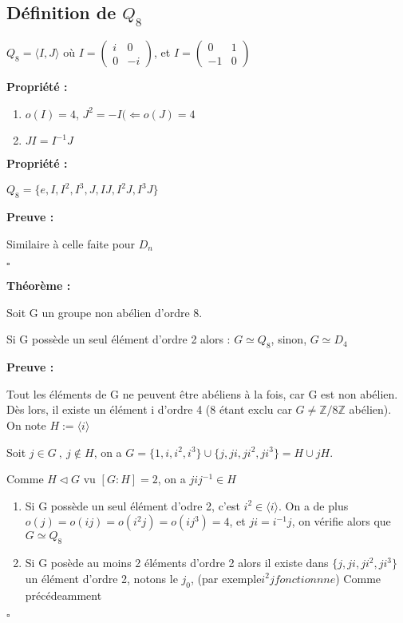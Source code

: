\documentclass{report}
\renewenvironment{leftbar}{%
  \def\FrameCommand{\vrule width 0.4pt \hspace{10pt}}%
  \MakeFramed {\advance\hsize-\width \FrameRestore}}%
 {\endMakeFramed}%
\newenvironment{preuve}{\vspace*{0.5cm}
    \begin{leftbar}
    \noindent\textbf{Preuve :}\par}{
    \begin{flushright}
    $\square$
    \end{flushright}
    \end{leftbar}
}
\newenvironment{prop}{\begin{tcolorbox}[colframe= white]
    \textbf{Propriété :}
     \par}
    {\end{tcolorbox}}
\newenvironment{theoreme}[1][]{
    \begin{tcolorbox}[]
    \textbf{Théorème :} #1  \par} 
    {\end{tcolorbox}}
\newcommand{\Z}{\mathbb{Z}}
\newcommand{\dn}{D_{n}}
\begin{document}
\subsection{Définition de $Q_{8}$}

$Q_{8}= \langle I,J \rangle$ où $I = \begin{pmatrix}
i&0\\
0&-i
\end{pmatrix}$, et $I = \begin{pmatrix}
0&1\\
-1&0
\end{pmatrix}$

\begin{prop}
\begin{enumerate}
\item $o(I)=4$, $J^2=-I(\Leftarrow o(J)=4$
\item $JI=I^{-1}J$
\end{enumerate}
\end{prop}


\begin{prop}
$Q_{8}= \{ e,I,I^{2},I^{3},J,IJ,I^{2}J,I^{3}J \}$
\end{prop}
\begin{preuve}
Similaire à celle faite pour $\dn$
\end{preuve}


\begin{theoreme}
Soit G un groupe non abélien d'ordre 8.\par
Si G possède un seul élément d'ordre 2 alors : $G\simeq Q_{8}$, sinon, $G\simeq D_{4}$
\end{theoreme}


\begin{preuve}
Tout les éléments de G ne peuvent être abéliens à la fois, car G est non abélien. Dès lors, il existe un élément i d'ordre 4 (8 étant exclu car $G\neq \Z/8\Z$ abélien). On note $H:=\langle i \rangle$\par 
Soit $j\in G~,~ j\notin H$, on a $G = \{ 1,i,i^2,i^3 \} \cup \{ j,ji,ji^2,ji^3 \} = H \cup jH$.\par
Comme $H\triangleleft G$ vu $[G:H]=2$, on a $jij^{-1} \in H$

\begin{enumerate}
\item Si G possède un seul élément d'odre 2, c'est  $i^{2}\in \langle i \rangle$. On a de plus $o(j)=o(ij)=o(i^{2}j)=o(ij^{3})=4$, et $ji=i^{-1}j$, on vérifie alors que $G\simeq Q_{8}$
\item
Si G posède au moins 2 éléments d'ordre 2 alors il existe dans $ \{ j,ji,ji^2,ji^3 \}$ un élément d'ordre 2, notons le $j_{0}$, (par exemple$i^{2}j fonctionnne$)
Comme précédeamment 

\end{enumerate}
\end{preuve}
\end{document}
